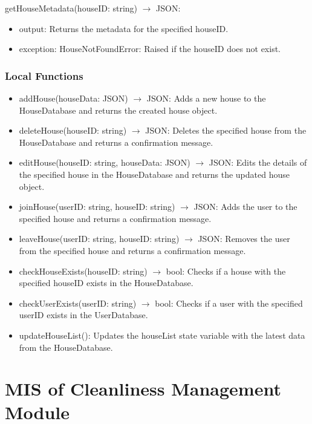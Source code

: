 \documentclass[12pt, titlepage]{article}
\begin{document}
\noindent getHouseMetadata(houseID: string) $\rightarrow$ JSON:
\begin{itemize}
\item output: Returns the metadata for the specified houseID.
\item exception: HouseNotFoundError: Raised if the houseID does not exist.
\end{itemize}

\subsubsection{Local Functions}

\begin{itemize}
  \item addHouse(houseData: JSON) $\rightarrow$ JSON: Adds a new house to the HouseDatabase and returns the created house object.
  \item deleteHouse(houseID: string) $\rightarrow$ JSON: Deletes the specified house from the HouseDatabase and returns a confirmation message.
  \item editHouse(houseID: string, houseData: JSON) $\rightarrow$ JSON: Edits the details of the specified house in the HouseDatabase and returns the updated house object.
  \item joinHouse(userID: string, houseID: string) $\rightarrow$ JSON: Adds the user to the specified house and returns a confirmation message.
  \item leaveHouse(userID: string, houseID: string) $\rightarrow$ JSON: Removes the user from the specified house and returns a confirmation message.
  \item checkHouseExists(houseID: string) $\rightarrow$ bool: Checks if a house with the specified houseID exists in the HouseDatabase.
  \item checkUserExists(userID: string) $\rightarrow$ bool: Checks if a user with the specified userID exists in the UserDatabase.
  \item updateHouseList(): Updates the houseList state variable with the latest data from the HouseDatabase.
\end{itemize}

\newpage

\section{MIS of Cleanliness Management Module} \label{Module}
\end{document}
